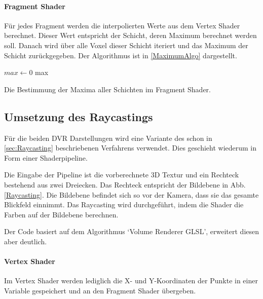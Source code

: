 \documentclass[a4paper,fontsize=12pt,toc=bib,halfparskip]{scrartcl}
\begin{document}
\paragraph{Fragment Shader}
F\"ur jedes Fragment werden die interpolierten Werte aus dem Vertex Shader berechnet. Dieser Wert entspricht der Schicht, deren Maximum berechnet werden soll. Danach wird \"uber alle Voxel dieser Schicht iteriert und das Maximum der Schicht zur\"uckgegeben. Der Algorithmus ist in \ref{MaximumAlgo} dargestellt.

\begin{algorithm}
	
	$max \gets 0$\;
	\Return max\;
	\vspace{0.5cm}
	\caption{Die Bestimmung der Maxima aller Schichten im Fragment Shader.}
	\label{MaximumAlgo}
\end{algorithm}

\subsection{Umsetzung des Raycastings}
\label{RaycastingImplementation}

F\"ur die beiden DVR Darstellungen wird eine Variante des schon in \ref{sec:Raycasting} beschriebenen Verfahrens verwendet. Dies geschieht wiederum in Form einer Shaderpipeline.

Die Eingabe der Pipeline ist die vorberechnete 3D Textur und ein Rechteck bestehend aus zwei Dreiecken. Das Rechteck entspricht der Bildebene in Abb. \ref{Raycasting}. Die Bildebene befindet sich so vor der Kamera, dass sie das gesamte Blickfeld einnimmt. Das Raycasting wird durchgef\"uhrt, indem die Shader die Farben auf der Bildebene berechnen.

Der Code basiert auf dem Algorithmus `Volume Renderer GLSL', erweitert diesen aber deutlich.

\paragraph{Vertex Shader}
Im Vertex Shader werden lediglich die X- und Y-Koordinaten der Punkte in einer Variable gespeichert und an den Fragment Shader \"ubergeben.
\end{document}
